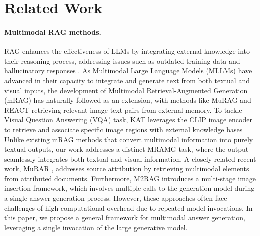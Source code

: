 \section{Related Work}
\label{sec:related_work}

\iffalse
\paragraph{Multimodal RAG methods.}
RAG \citep{2020RAG, zhao2024retrieval} enhances the effectiveness of LLMs by integrating external knowledge into their reasoning process, addressing issues such as outdated training data and hallucinatory responses \citep{hallucination, gupta2024rag}.
As Multimodal Large Language Models (MLLMs) have advanced in their capacity to integrate and generate text from both textual and visual inputs, the development of Multimodal Retrieval-Augmented Generation (mRAG) has naturally followed as an extension, with methods like MuRAG \citep{chen2022murag} and REACT \citep{liu2023learning} retrieving relevant image-text pairs from external memory.
To tackle Visual Question Answering (VQA) task, KAT \citep{gui2021kat} leverages the CLIP \citep{radford2021learning} image encoder to retrieve and associate specific image regions with external knowledge bases
Unlike existing mRAG methods that convert multimodal information into purely textual outputs, our work addresses a distinct MRAMG task, where the output seamlessly integrates both textual and visual information.
A closely related recent work, MuRAR \citep{zhu2024murar}, addresses source attribution by retrieving multimodal elements from attributed documents. Furthermore, M2RAG \citep{ma2024multi} introduces a multi-stage image insertion framework, which involves multiple calls to the generation model during a single answer generation process.
However, these approaches often face challenges of high computational overhead due to repeated model invocations. In this paper, we propose a general framework for multimodal answer generation, leveraging a single invocation of the large generative model.
